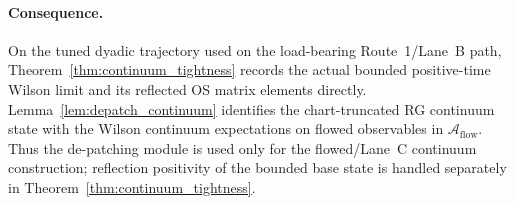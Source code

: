 \paragraph{Consequence.}
On the tuned dyadic trajectory used on the load-bearing Route~1/Lane~B path, Theorem~\ref{thm:continuum_tightness} records the actual bounded positive-time Wilson limit and its reflected OS matrix elements directly.
Lemma~\ref{lem:depatch_continuum} identifies the chart-truncated RG continuum state with the Wilson continuum expectations on flowed observables in $\mathcal A_{\mathrm{flow}}$.
Thus the de-patching module is used only for the flowed/Lane~C continuum construction; reflection positivity of the bounded base state is handled separately in Theorem~\ref{thm:continuum_tightness}.
